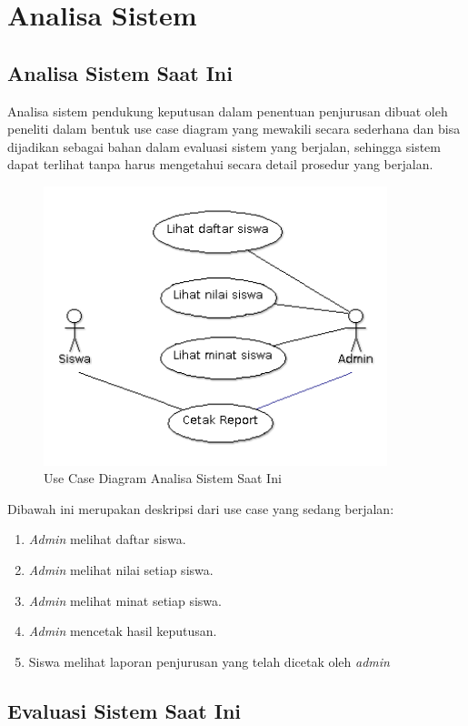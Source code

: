 \section{Analisa Sistem}

\subsection{Analisa Sistem Saat Ini}
Analisa sistem pendukung keputusan dalam penentuan penjurusan dibuat oleh peneliti dalam bentuk use case diagram yang mewakili secara sederhana dan bisa dijadikan sebagai bahan dalam evaluasi sistem yang berjalan, sehingga sistem dapat terlihat tanpa harus mengetahui secara detail prosedur yang berjalan.
\begin{figure}[ht]
	\centering
	\includegraphics[width=10cm]{images/UseCaseDiagramSistemSaatIni}
	\caption{Use Case Diagram Analisa Sistem Saat Ini}
\end{figure}

\newpage
\noindent Dibawah ini merupakan deskripsi dari use case yang sedang berjalan:
\begin{enumerate}[nolistsep,leftmargin=0.5cm]
\item \textit{Admin} melihat daftar siswa.
\item \textit{Admin} melihat nilai setiap siswa.
\item \textit{Admin} melihat minat setiap siswa.
\item \textit{Admin} mencetak hasil keputusan.
\item Siswa melihat laporan penjurusan yang telah dicetak oleh \textit{admin}
\end{enumerate}

\subsection{Evaluasi Sistem Saat Ini}

